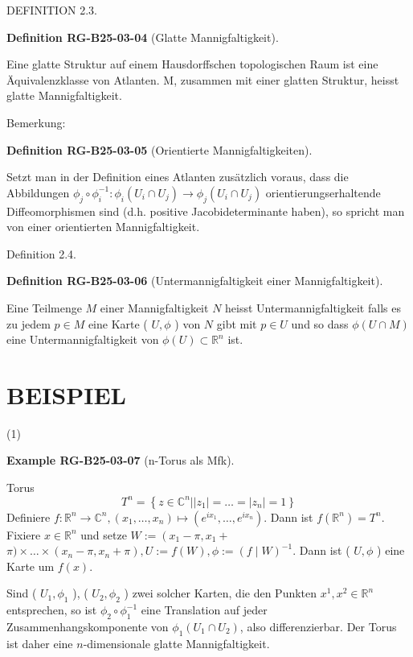 \documentclass[10pt, letterpaper]{article}
\newcommand{\CustomHeading}[3]{%
  \par\medskip\noindent%
  \textbf{#1 #2} \textnormal{(#3)}.\enskip%
}
\newenvironment{DEF}[2]{\begin{unitbox}\CustomHeading{Definition}{#1}{#2}}{\end{unitbox}}
\newenvironment{EXA}[2]{\begin{unitbox}\CustomHeading{Example}{#1}{#2}}{\end{unitbox}}
\begin{document}
DEFINITION 2.3. 


\begin{DEF}{RG-B25-03-04}{Glatte Mannigfaltigkeit}
Eine glatte Struktur auf einem Hausdorffschen topologischen Raum ist eine Äquivalenzklasse von Atlanten. M, zusammen mit einer glatten Struktur, heisst glatte Mannigfaltigkeit.
\end{DEF}



Bemerkung: 

\begin{DEF}{RG-B25-03-05}{Orientierte Mannigfaltigkeiten}
Setzt man in der Definition eines Atlanten zusätzlich voraus, dass die Abbildungen $\phi_{j} \circ \phi_{i}^{-1}: \phi_{i}\left(U_{i} \cap U_{j}\right) \rightarrow \phi_{j}\left(U_{i} \cap U_{j}\right)$ orientierungserhaltende Diffeomorphismen sind (d.h. positive Jacobideterminante haben), so spricht man von einer orientierten Mannigfaltigkeit.
\end{DEF}

Definition 2.4. 


\begin{DEF}{RG-B25-03-06}{Untermannigfaltigkeit einer Mannigfaltigkeit}
Eine Teilmenge $M$ einer Mannigfaltigkeit $N$ heisst Untermannigfaltigkeit falls es zu jedem $p \in M$ eine Karte ( $U, \phi$ ) von $N$ gibt mit $p \in U$ und so dass $\phi(U \cap M)$ eine Untermannigfaltigkeit von $\phi(U) \subset \mathbb{R}^{n}$ ist.
\end{DEF}



\section*{BEISPIEL}
(1) 


\begin{EXA}{RG-B25-03-07}{n-Torus als Mfk}
Torus
$$
T^{n}=\left\{z \in \mathbb{C}^{n}| | z_{1}\left|=\ldots=\left|z_{n}\right|=1\right\}\right.
$$
Definiere $f: \mathbb{R}^{n} \rightarrow \mathbb{C}^{n},\left(x_{1}, \ldots, x_{n}\right) \mapsto\left(e^{i x_{1}}, \ldots, e^{i x_{n}}\right)$. Dann ist $f\left(\mathbb{R}^{n}\right)=T^{n}$. Fixiere $x \in \mathbb{R}^{n}$ und setze $W:=\left(x_{1}-\pi, x_{1}+\right.$ $\pi) \times \ldots \times\left(x_{n}-\pi, x_{n}+\pi\right), U:=f(W), \phi:=(f \mid W)^{-1}$. Dann ist ( $U, \phi$ ) eine Karte um $f(x)$.

Sind ( $U_{1}, \phi_{1}$ ), ( $U_{2}, \phi_{2}$ ) zwei solcher Karten, die den Punkten $x^{1}, x^{2} \in \mathbb{R}^{n}$ entsprechen, so ist $\phi_{2} \circ \phi_{1}^{-1}$ eine Translation auf jeder Zusammenhangskomponente von $\phi_{1}\left(U_{1} \cap U_{2}\right)$, also differenzierbar. Der Torus ist daher eine $n$-dimensionale glatte Mannigfaltigkeit.
\end{EXA}
\end{document}

